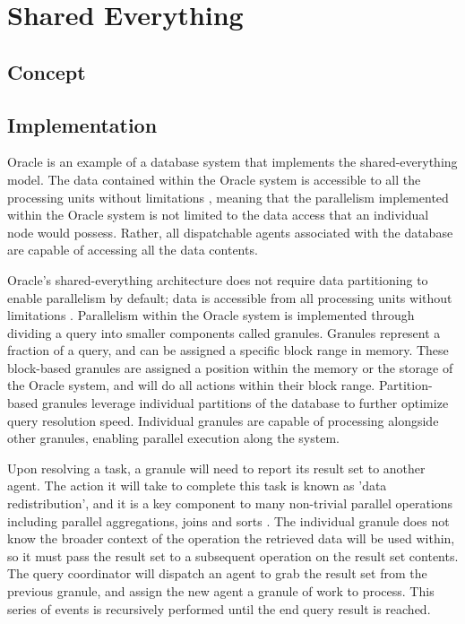 \documentclass[onecolumn, draftclsnofoot,10pt, compsoc]{IEEEtran}
\begin{document}
	\newpage
	\tableofcontents
	\clearpage
	
	\section{Shared Everything}

    \subsection{Concept}

    \subsection{Implementation}
\indent Oracle is an example of a database system that implements the shared-everything model.
The data contained within the Oracle system is accessible to all the processing units without limitations \cite{OraclePEwODF}, meaning that the parallelism implemented within the Oracle system is not limited to the data access that an individual node would possess.
Rather, all dispatchable agents associated with the database are capable of accessing all the data contents.

\indent Oracle’s shared-everything architecture does not require data partitioning to enable parallelism by default; data is accessible from all processing units without limitations \cite{OraclePEwODF}. 
Parallelism within the Oracle system is implemented through dividing a query into smaller components called granules.
Granules represent a fraction of a query, and can be assigned a specific block range in memory.
These block-based granules are assigned a position within the memory or the storage of the Oracle system, and will do all actions within their block range.
Partition-based granules leverage individual partitions of the database to further optimize query resolution speed.
Individual granules are capable of processing alongside other granules, enabling parallel execution along the system. 

\indent Upon resolving a task, a granule will need to report its result set to another agent. 
The action it will take to complete this task is known as 'data redistribution', and it is a key component to many non-trivial parallel operations including parallel aggregations, joins and sorts \cite{OraclePEwODF}.
The individual granule does not know the broader context of the operation the retrieved data will be used within, so it must pass the result set to a subsequent operation on the result set contents.
The query coordinator will dispatch an agent to grab the result set from the previous granule, and assign the new agent a granule of work to process.
This series of events is recursively performed until the end query result is reached.
\end{document}
